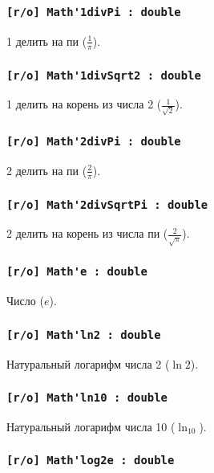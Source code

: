 \subsubsection{\lstinline|[r/o] Math'1divPi : double|}

1 делить на пи ($\frac{1}{\pi}$).

\subsubsection{\lstinline|[r/o] Math'1divSqrt2 : double|}

1 делить на корень из числа 2 ($\frac{1}{\sqrt{2}}$).

\subsubsection{\lstinline|[r/o] Math'2divPi : double|}

2 делить на пи ($\frac{2}{\pi}$).

\subsubsection{\lstinline|[r/o] Math'2divSqrtPi : double|}

2 делить на корень из числа пи ($\frac{2}{\sqrt{\pi}}$).

\subsubsection{\lstinline|[r/o] Math'e : double|}

Число ($e$).

\subsubsection{\lstinline|[r/o] Math'ln2 : double|}

Натуральный логарифм числа 2 ($\ln{2}$).

\subsubsection{\lstinline|[r/o] Math'ln10 : double|}

Натуральный логарифм числа 10 ($\ln_{10}$).

\subsubsection{\lstinline|[r/o] Math'log2e : double|}

